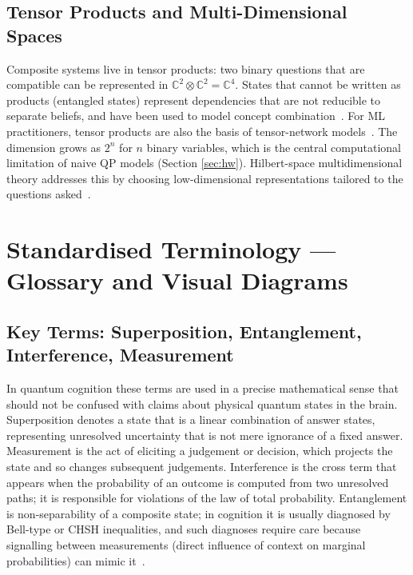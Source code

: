 \documentclass[pdflatex,sn-basic]{sn-jnl}
\begin{document}
\subsection{Tensor Products and Multi-Dimensional Spaces}\label{sec:tensor}
Composite systems live in tensor products: two binary questions that are compatible can be represented in $\mathbb{C}^2 \otimes \mathbb{C}^2 = \mathbb{C}^4$. States that cannot be written as products (entangled states) represent dependencies that are not reducible to separate beliefs, and have been used to model concept combination~\citep{Aerts2011a}. For ML practitioners, tensor products are also the basis of tensor-network models~\citep{Stoudenmire2016}. The dimension grows as $2^n$ for $n$ binary variables, which is the central computational limitation of naive QP models (Section \ref{sec:hw}). Hilbert-space multidimensional theory addresses this by choosing low-dimensional representations tailored to the questions asked~\citep{Busemeyer2018}.


\section{Standardised Terminology --- Glossary and Visual Diagrams}\label{sec:terminology}

\subsection{Key Terms: Superposition, Entanglement, Interference, Measurement}\label{sec:terms}
In quantum cognition these terms are used in a precise mathematical sense that should not be confused with claims about physical quantum states in the brain. Superposition denotes a state that is a linear combination of answer states, representing unresolved uncertainty that is not mere ignorance of a fixed answer. Measurement is the act of eliciting a judgement or decision, which projects the state and so changes subsequent judgements. Interference is the cross term that appears when the probability of an outcome is computed from two unresolved paths; it is responsible for violations of the law of total probability. Entanglement is non-separability of a composite state; in cognition it is usually diagnosed by Bell-type or CHSH inequalities, and such diagnoses require care because signalling between measurements (direct influence of context on marginal probabilities) can mimic it~\citep{Dzhafarov2016a}.
\end{document}
